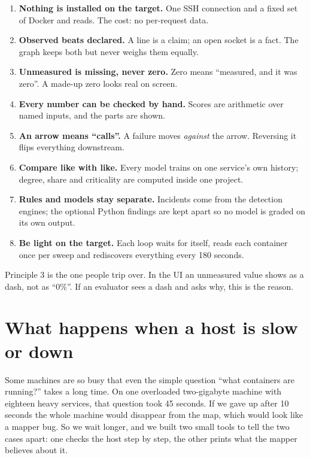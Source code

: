 \begin{enumerate}
\item \textbf{Nothing is installed on the target.} One SSH connection and a fixed set of Docker and  reads. The cost: no per-request data.
\item \textbf{Observed beats declared.} A  line is a claim; an open socket is a fact. The graph keeps both but never weighs them equally.
\item \textbf{Unmeasured is missing, never zero.} Zero means ``measured, and it was zero''. A made-up zero looks real on screen.
\item \textbf{Every number can be checked by hand.} Scores are arithmetic over named inputs, and the parts are shown.
\item \textbf{An arrow means ``calls''.} A failure moves \emph{against} the arrow. Reversing it flips everything downstream.
\item \textbf{Compare like with like.} Every model trains on one service's own history; degree, share and criticality are computed inside one project.
\item \textbf{Rules and models stay separate.} Incidents come from the detection engines; the optional Python findings are kept apart so no model is graded on its own output.
\item \textbf{Be light on the target.} Each loop waits for itself, reads each container once per sweep and rediscovers everything every 180 seconds.
\end{enumerate}

\begin{warnbox}
Principle 3 is the one people trip over. In the UI an unmeasured value shows as a dash, not as ``0\%''. If an evaluator sees a dash and asks why, this is the reason.
\end{warnbox}

\section{What happens when a host is slow or down}
\begin{simplebox}
Some machines are so busy that even the simple question ``what containers are running?'' takes a long time. On one overloaded two-gigabyte machine with eighteen heavy services, that question took 45 seconds. If we gave up after 10 seconds the whole machine would disappear from the map, which would look like a mapper bug. So we wait longer, and we built two small tools to tell the two cases apart: one checks the host step by step, the other prints what the mapper believes about it.
\end{simplebox}

